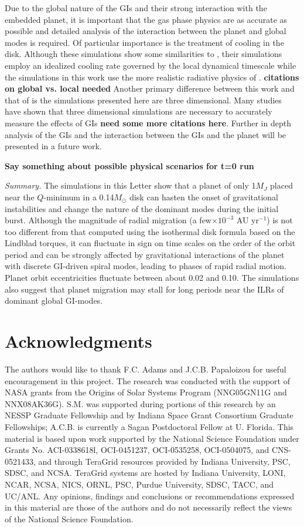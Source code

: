 \documentclass[12pt,manuscript,authoryear]{aastex}
\begin{document}
Due to the global nature of the GIs and their strong interaction with the embedded planet, it is important that the gas
phase physics are as accurate as possible and detailed analysis of the interaction between the planet and global modes
is required. Of particular importance is the treatment of cooling in the disk. Although these simulations show some
similarities to \citet{baruteau2011}, their simulations employ an idealized cooling rate governed by the local dynamical
timescale while the simulations in this work use the more realistic radiative physics of \citet{boley2007b}. {\bf
  citations on global vs. local needed} Another primary difference between this work and that of \citet{baruteau2011} is
the simulations presented here are three dimensional. Many studies have shown that three dimensional simulations are
necessary to accurately measure the effects of GIs {\bf need some more citations here}. Further in depth analysis of the
GIs and the interaction between the GIs and the planet will be presented in a future work.

{\bf Say something about possible physical scenarios for t=0 run}

{\it Summary.} The simulations in this Letter show that a planet of only 1$M_J$ placed near the $Q$-minimum in a
0.14$M_{\odot}$ disk can hasten the onset of gravitational instabilities and change the nature of the dominant modes
during the initial burst. Although the magnitude of radial migration (a few$\times10^{-3}$ AU yr$^{-1}$) is not too
different from that computed using the \citet{tanaka2002} isothermal disk formula based on the Lindblad torques, it can
fluctuate in sign on time scales on the order of the orbit period and can be strongly affected by gravitational
interactions of the planet with discrete GI-driven spiral modes, leading to phases of rapid radial motion. Planet orbit
eccentricities fluctuate between about 0.02 and 0.10. The simulations also suggest that planet migration may stall for
long periods near the ILRs of dominant global GI-modes.

\section{Acknowledgments}

The authors would like to thank F.C. Adams and J.C.B. Papaloizou for useful encouragement in this project. The research
was conducted with the support of NASA grants from the Origins of Solar Systems Program (NNG05GN11G and
NNX08AK36G). S.M. was supported during portions of this research by an NESSP Graduate Fellowship and by Indiana Space
Grant Consortium Graduate Fellowships; A.C.B. is currently a Sagan Postdoctoral Fellow at U. Florida. This material is
based upon work supported by the National Science Foundation under Grants No. ACI-0338618l, OCI-0451237, OCI-0535258,
OCI-0504075, and CNS-0521433, and through TeraGrid resources provided by Indiana University, PSC, SDSC, and
NCSA. TeraGrid systems are hosted by Indiana University, LONI, NCAR, NCSA, NICS, ORNL, PSC, Purdue University, SDSC,
TACC, and UC/ANL. Any opinions, findings and conclusions or recommendations expressed in this material are those of the
authors and do not necessarily reflect the views of the National Science Foundation.
\end{document}
